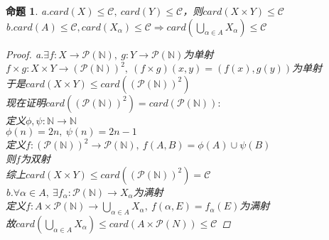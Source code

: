 \documentclass[12pt, a4paper, oneside]{ctexbook}
\newtheorem{proposition}[theorem]{命题}
\begin{document}
\begin{proposition}
    a.$card(X)\leq\mathcal{C},\ card(Y)\leq\mathcal{C}$，则$card(X\times Y)\leq\mathcal{C}$\\
    b.$card(A)\leq\mathcal{C},card(X_{\alpha})\leq\mathcal{C}\Rightarrow card(\bigcup_{\alpha\in A}X_{\alpha})\leq\mathcal{C}$
    \begin{proof}
        a.$\exists f:X\rightarrow \mathcal{P}(\mathbb{N}),\ g:Y\rightarrow \mathcal{P}(\mathbb{N})$为单射\\
        $f\times g:X\times Y\rightarrow (\mathcal{P}(\mathbb{N}))^2,\ (f\times g)(x,y)=(f(x),g(y))$为单射\\
        于是$card(X\times Y)\leq card((\mathcal{P}(\mathbb{N}))^2)$\\
        现在证明$card((\mathcal{P}(\mathbb{N}))^2)=card(\mathcal{P}(\mathbb{N})):$\\
        定义$\phi,\psi :\mathbb{N}\rightarrow\mathbb{N}$\\
        $\phi(n)=2n,\ \psi(n)=2n-1$\\
        定义$f:(\mathcal{P}(\mathbb{N}))^2\rightarrow \mathcal{P}(\mathbb{N}),\ f(A,B)=\phi(A)\cup\psi(B)$\\
        则$f$为双射\\
        综上$card(X\times Y)\leq card((\mathcal{P}(\mathbb{N}))^2)=\mathcal{C}$\\[0.5cm]
        b.$\forall\alpha\in A,\ \exists f_{\alpha}:\mathcal{P}(\mathbb{N})\rightarrow X_{\alpha}$为满射\\
        定义$f:A\times\mathcal{P}(\mathbb{N})\rightarrow \bigcup_{\alpha\in A}X_{\alpha},\ f(\alpha,E)=f_{\alpha}(E)$为满射\\
        故$card(\bigcup_{\alpha\in A}X_{\alpha})\leq card(A\times\mathcal{P}(N))\leq\mathcal{C}$
    \end{proof}
\end{proposition}
\end{document}
